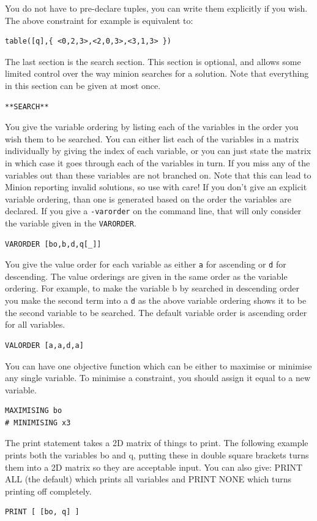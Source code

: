 \documentclass[oneside]{book}
\begin{document}
You do not have to pre-declare tuples, you can write them explicitly if you wish. The above constraint for example is equivalent to:
\begin{verbatim}
table([q],{ <0,2,3>,<2,0,3>,<3,1,3> })
\end{verbatim}

The last section is the search section. This section is optional, and allows some limited control over the way minion searches for a solution. Note that everything in this section can be given at most once.
\begin{verbatim}
**SEARCH** 
\end{verbatim}

You give the variable ordering by listing each of the variables in the order you wish them to be searched. You can either list each of the variables in a matrix individually by giving the index of each variable, or you can just state the matrix in which case it goes through each of the variables in turn. If you miss any of the variables out than these variables are not branched on. Note that this can lead to Minion reporting invalid solutions, so use with care! If you don't give an explicit variable ordering, than one is generated based on the order the variables are declared. If you give a \texttt{-varorder} on the command line, that will only consider the variable given in the \texttt{VARORDER}.
\begin{verbatim}
VARORDER [bo,b,d,q[_]] 
\end{verbatim}

You give the value order for each variable as either \texttt{a} for ascending or \texttt{d} for descending. The value orderings are given in the same order as the variable ordering. For example, to make the variable b by searched in descending order you make the second term into a \texttt{d} as the above variable ordering shows it to be the second variable to be searched. The default variable order is ascending order for all variables.
\begin{verbatim}
VALORDER [a,a,d,a]
\end{verbatim}

You can have one objective function which can be either to maximise or minimise any single variable. To minimise a constraint, you should assign it equal to a new variable.
\begin{verbatim}
MAXIMISING bo
# MINIMISING x3
\end{verbatim}

The print statement takes a 2D matrix of things to print. The following example prints both the variables bo and q, putting these in double square brackets turns them into a 2D matrix so they are acceptable input.  You can also give:  PRINT ALL (the default) which prints all variables and PRINT NONE which turns printing off completely.
\begin{verbatim}
PRINT [ [bo, q] ]
\end{verbatim}
\end{document}
